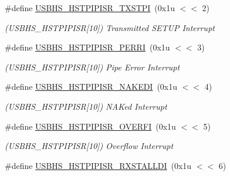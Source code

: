 \begin{DoxyCompactItemize}
\#define \mbox{\hyperlink{group__SAMS70__USBHS_ga5b657f7ffb9144716c472b4873838612}{U\+S\+B\+H\+S\+\_\+\+H\+S\+T\+P\+I\+P\+I\+S\+R\+\_\+\+T\+X\+S\+T\+PI}}~(0x1u $<$$<$ 2)
\begin{DoxyCompactList}\small\item\em (U\+S\+B\+H\+S\+\_\+\+H\+S\+T\+P\+I\+P\+I\+SR\mbox{[}10\mbox{]}) Transmitted S\+E\+T\+UP Interrupt \end{DoxyCompactList}\item 
\mbox{\label{group__SAMS70__USBHS_ga73998e12ffdfca1ab0bc9cf53797332c}} 
\#define \mbox{\hyperlink{group__SAMS70__USBHS_ga73998e12ffdfca1ab0bc9cf53797332c}{U\+S\+B\+H\+S\+\_\+\+H\+S\+T\+P\+I\+P\+I\+S\+R\+\_\+\+P\+E\+R\+RI}}~(0x1u $<$$<$ 3)
\begin{DoxyCompactList}\small\item\em (U\+S\+B\+H\+S\+\_\+\+H\+S\+T\+P\+I\+P\+I\+SR\mbox{[}10\mbox{]}) Pipe Error Interrupt \end{DoxyCompactList}\item 
\mbox{\label{group__SAMS70__USBHS_gafefe427d47e2f528a7608c5313e2e9a7}} 
\#define \mbox{\hyperlink{group__SAMS70__USBHS_gafefe427d47e2f528a7608c5313e2e9a7}{U\+S\+B\+H\+S\+\_\+\+H\+S\+T\+P\+I\+P\+I\+S\+R\+\_\+\+N\+A\+K\+E\+DI}}~(0x1u $<$$<$ 4)
\begin{DoxyCompactList}\small\item\em (U\+S\+B\+H\+S\+\_\+\+H\+S\+T\+P\+I\+P\+I\+SR\mbox{[}10\mbox{]}) N\+A\+Ked Interrupt \end{DoxyCompactList}\item 
\mbox{\label{group__SAMS70__USBHS_ga557f28502fc74053e78b6ee0144e37e4}} 
\#define \mbox{\hyperlink{group__SAMS70__USBHS_ga557f28502fc74053e78b6ee0144e37e4}{U\+S\+B\+H\+S\+\_\+\+H\+S\+T\+P\+I\+P\+I\+S\+R\+\_\+\+O\+V\+E\+R\+FI}}~(0x1u $<$$<$ 5)
\begin{DoxyCompactList}\small\item\em (U\+S\+B\+H\+S\+\_\+\+H\+S\+T\+P\+I\+P\+I\+SR\mbox{[}10\mbox{]}) Overflow Interrupt \end{DoxyCompactList}\item 
\mbox{\label{group__SAMS70__USBHS_ga49bab8fafde4c709dd7decb1c97b0503}} 
\#define \mbox{\hyperlink{group__SAMS70__USBHS_ga49bab8fafde4c709dd7decb1c97b0503}{U\+S\+B\+H\+S\+\_\+\+H\+S\+T\+P\+I\+P\+I\+S\+R\+\_\+\+R\+X\+S\+T\+A\+L\+L\+DI}}~(0x1u $<$$<$ 6)
$$
\end{DoxyCompactItemize}
